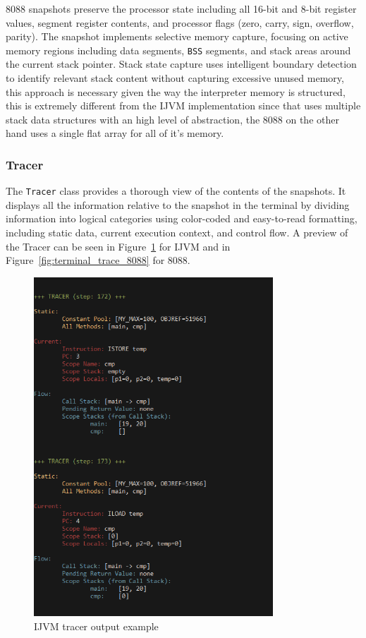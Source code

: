 \documentclass[11pt]{article}
\begin{document}
8088 snapshots preserve the processor state including all 16-bit and 8-bit register values, segment register contents, and processor flags (zero, carry, sign, overflow, parity). The snapshot implements selective memory capture, focusing on active memory regions including data segments, \texttt{BSS} segments, and stack areas around the current stack pointer. Stack state capture uses intelligent boundary detection to identify relevant stack content without capturing excessive unused memory, this approach is necessary given the way the interpreter memory is structured, this is extremely different from the IJVM implementation since that uses multiple stack data structures with an high level of abstraction, the 8088 on the other hand uses a single flat array for all of it's memory.

\subsubsection{Tracer}
The \texttt{Tracer} class provides a thorough view of the contents of the snapshots. It displays all the information relative to the snapshot in the terminal by dividing information into logical categories using color-coded and easy-to-read formatting, including static data, current execution context, and control flow. A preview of the Tracer can be seen in Figure~\ref{fig:terminal_trace_ijvm} for IJVM and in Figure~\ref{fig:terminal_trace_8088} for 8088.

\vspace{3em}

\begin{figure}[H]
    \centering
    \includegraphics[width=0.8\textwidth]{images/terminal_trace_ijvm.png}
    \caption{IJVM tracer output example}
    \label{fig:terminal_trace_ijvm}
\end{figure}
\end{document}
